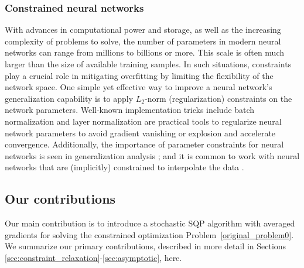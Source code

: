 \documentclass[aos]{imsart}
\numberwithin{equation}{section}
\theoremstyle{plain}
\begin{document}
\subsubsection{Constrained neural networks}
With advances in computational power and storage, as well as the increasing complexity of problems to solve, the number of parameters in modern neural networks can range from millions to billions or more. 
This scale is often much larger than the size of available training samples. In such situations, constraints play a crucial role in mitigating overfitting by limiting the flexibility of the network space.
One simple yet effective way to improve a neural network's generalization capability is to apply $L_2$-norm (regularization) constraints on the network parameters. 
Well-known implementation tricks include batch normalization and layer normalization are practical tools to regularize neural network parameters to avoid gradient vanishing or explosion and accelerate convergence. 
Additionally, the importance of parameter constraints for neural networks is seen in generalization analysis \cite{neyshabur2017exploring}; and it is common to work with neural networks that are (implicitly) constrained to interpolate the data \cite{MonoDDGP_TR22,iic_TR}.


\subsection{Our contributions}
Our main contribution is to introduce a stochastic SQP algorithm with averaged gradients for solving the constrained optimization Problem~\eqref{original_problem0}. 
We summarize our primary contributions, described in more detail in Sections \ref{sec:constraint_relaxation}-\ref{sec:asymptotic}, here.
\end{document}
